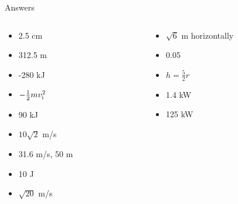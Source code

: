 \documentclass{beamer}
\begin{document}
\begin{frame}{Answers}
\begin{columns}[T]
\begin{column}{0.5\textwidth}
\begin{itemize}
\item 2.5 cm
\item 312.5 m
\item -280 kJ
\item $-\frac{1}{2} m v_{\rm i}^2$
\item 90 kJ
\item $10\sqrt{2}$ m/s
\item 31.6 m/s, 50 m
\item 10 J
\item $\sqrt{20}$ m/s
\end{itemize}
\end{column}
\begin{column}{0.5\textwidth}
\begin{itemize}
\item $\sqrt{6}$ m horizontally
\item 0.05
\item $h = \frac{5}{2}r$
\item 1.4 kW
\item 125 kW
\end{itemize}
\end{column}
\end{columns}
\end{frame}
\end{document}
